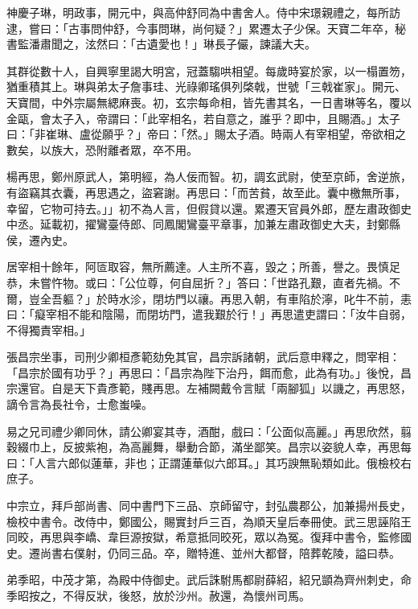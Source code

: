 \begin{pinyinscope}
 神慶子琳，明政事，開元中，與高仲舒同為中書舍人。侍中宋璟親禮之，每所訪逮，嘗曰：「古事問仲舒，今事問琳，尚何疑？」累遷太子少保。天寶二年卒，秘書監潘肅聞之，泫然曰：「古遺愛也！」琳長子儼，諫議大夫。



 其群從數十人，自興寧里謁大明宮，冠蓋騶哄相望。每歲時宴於家，以一榻置笏，猶重積其上。琳與弟太子詹事珪、光祿卿瑤俱列棨戟，世號「三戟崔家」。開元、天寶間，中外宗屬無緦麻喪。初，玄宗每命相，皆先書其名，一日書琳等名，覆以金甌，會太子入，帝謂曰：「此宰相名，若自意之，誰乎？即中，且賜酒。」太子曰：「非崔琳、盧從願乎？」帝曰：「然。」賜太子酒。時兩人有宰相望，帝欲相之數矣，以族大，恐附離者眾，卒不用。



 楊再思，鄭州原武人，第明經，為人佞而智。初，調玄武尉，使至京師，舍逆旅，有盜竊其衣囊，再思遇之，盜窘謝。再思曰：「而苦貧，故至此。囊中檄無所事，幸留，它物可持去。」」初不為人言，但假貸以還。累遷天官員外郎，歷左肅政御史中丞。延載初，擢鸞臺侍郎、同鳳閣鸞臺平章事，加兼左肅政御史大夫，封鄭縣侯，遷內史。



 居宰相十餘年，阿匼取容，無所薦達。人主所不喜，毀之；所善，譽之。畏慎足恭，未嘗忤物。或曰：「公位尊，何自屈折？」答曰：「世路孔艱，直者先禍。不爾，豈全吾軀？」於時水沴，閉坊門以禳。再思入朝，有車陷於濘，叱牛不前，恚曰：「癡宰相不能和陰陽，而閉坊門，遣我艱於行！」再思遣吏謂曰：「汝牛自弱，不得獨責宰相。」



 張昌宗坐事，司刑少卿桓彥範劾免其官，昌宗訴諸朝，武后意申釋之，問宰相：「昌宗於國有功乎？」再思曰：「昌宗為陛下治丹，餌而愈，此為有功。」後悅，昌宗還官。自是天下貴彥範，賤再思。左補闕戴令言賦「兩腳狐」以譏之，再思怒，謫令言為長社令，士愈蚩噪。



 易之兄司禮少卿同休，請公卿宴其寺，酒酣，戲曰：「公面似高麗。」再思欣然，翦穀綴巾上，反披紫袍，為高麗舞，舉動合節，滿坐鄙笑。昌宗以姿貌人幸，再思每曰：「人言六郎似蓮華，非也；正謂蓮華似六郎耳。」其巧諛無恥類如此。俄檢校右庶子。



 中宗立，拜戶部尚書、同中書門下三品、京師留守，封弘農郡公，加兼揚州長史，檢校中書令。改侍中，鄭國公，賜實封戶三百，為順天皇后奉冊使。武三思誣陷王同晈，再思與李嶠、韋巨源按獄，希意抵同晈死，眾以為冤。復拜中書令，監修國史。遷尚書右僕射，仍同三品。卒，贈特進、並州大都督，陪葬乾陵，謚曰恭。



 弟季昭，中茂才第，為殿中侍御史。武后誅駙馬都尉薛紹，紹兄顗為齊州刺史，命季昭按之，不得反狀，後怒，放於沙州。赦還，為懷州司馬。




\end{pinyinscope}
